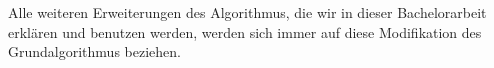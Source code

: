 Alle weiteren Erweiterungen des Algorithmus, die wir in dieser Bachelorarbeit erklären und benutzen werden, werden sich immer auf diese Modifikation des Grundalgorithmus beziehen.

%
%	
%	


